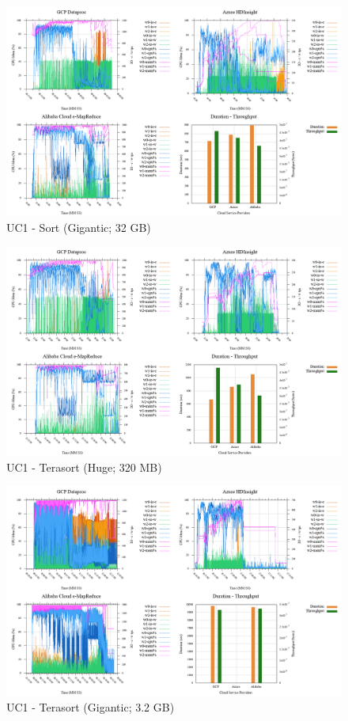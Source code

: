 \documentclass[review]{elsarticle}
\begin{document}
\begin{figure}[b]
	\caption{UC1 - Sort (Gigantic; 32 GB)}
	\includegraphics[width=\textwidth]{uc1-srt-g-cmidt}
	\centering
\end{figure}

\begin{figure}[b]
	\caption{UC1 - Terasort (Huge; 320 MB)}
	\includegraphics[width=\textwidth]{uc1-tera-h-cmidt}
	\centering
\end{figure}

\begin{figure}[b]
	\caption{UC1 - Terasort (Gigantic; 3.2 GB)}
	\includegraphics[width=\textwidth]{uc1-tera-g-cmidt}
	\centering
\end{figure}
\end{document}
